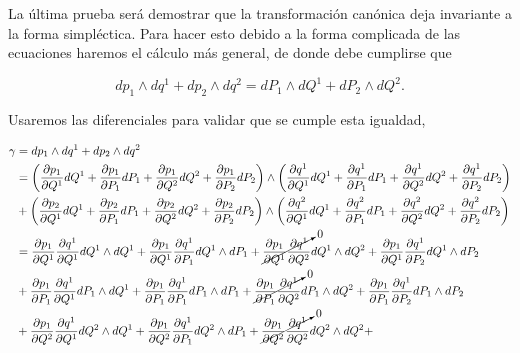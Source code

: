 \documentclass[a4paper,10pt]{article}
\numberwithin{equation}{section}
\begin{document}
La última prueba será demostrar que la transformación canónica deja invariante 
a la forma simpléctica. Para hacer esto debido a la forma complicada de las ecuaciones 
haremos el cálculo más general, de donde debe cumplirse que 

\begin{equation}
 dp_1 \wedge dq^1 + dp_2 \wedge dq^2 = dP_1 \wedge dQ^1 + dP_2 \wedge dQ^2.
\end{equation}

Usaremos las diferenciales para validar que se cumple esta igualdad,

\begin{align*}
 \gamma &= dp_1 \wedge dq^1 + dp_2 \wedge dq^2 \\
 &= \left(\frac{\partial p_1}{\partial Q^1}dQ^1 + \frac{\partial p_1}{\partial P_1}dP_1 + 
 \frac{\partial p_1}{\partial Q^2}dQ^2 + \frac{\partial p_1}{\partial P_2}dP_2 \right) 
 \wedge \left(\frac{\partial q^1}{\partial Q^1}dQ^1 + \frac{\partial q^1}{\partial P_1}dP_1 + 
 \frac{\partial q^1}{\partial Q^2}dQ^2 + \frac{\partial q^1}{\partial P_2}dP_2 \right) \\
 &+ \left(\frac{\partial p_2}{\partial Q^1}dQ^1 + \frac{\partial p_2}{\partial P_1}dP_1 + 
 \frac{\partial p_2}{\partial Q^2}dQ^2 + \frac{\partial p_2}{\partial P_2}dP_2 \right) 
 \wedge \left(\frac{\partial q^2}{\partial Q^1}dQ^1 + \frac{\partial q^2}{\partial P_1}dP_1 + 
 \frac{\partial q^2}{\partial Q^2}dQ^2 + \frac{\partial q^2}{\partial P_2}dP_2 \right) \\
 &= \frac{\partial p_1}{\partial Q^1}\frac{\partial q^1}{\partial Q^1}dQ^1 \wedge dQ^1 + 
 \frac{\partial p_1}{\partial Q^1}\frac{\partial q^1}{\partial P_1}dQ^1 \wedge dP_1 + 
 \cancelto{0}{\frac{\partial p_1}{\partial Q^1}\frac{\partial q^1}{\partial Q^2}}dQ^1 \wedge dQ^2 + 
 \frac{\partial p_1}{\partial Q^1}\frac{\partial q^1}{\partial P_2}dQ^1 \wedge dP_2 \\
 &+ \frac{\partial p_1}{\partial P_1}\frac{\partial q^1}{\partial Q^1} dP_1 \wedge dQ^1 +
 \frac{\partial p_1}{\partial P_1}\frac{\partial q^1}{\partial P_1} dP_1 \wedge dP_1 + 
 \cancelto{0}{\frac{\partial p_1}{\partial P_1}\frac{\partial q^1}{\partial Q^2}} dP_1 \wedge dQ^2 + 
 \frac{\partial p_1}{\partial P_1}\frac{\partial q^1}{\partial P_2} dP_1 \wedge dP_2 \\
 &+  \frac{\partial p_1}{\partial Q^2}\frac{\partial q^1}{\partial Q^1} dQ^2 \wedge dQ^1 
 + \frac{\partial p_1}{\partial Q^2}\frac{\partial q^1}{\partial P_1} dQ^2 \wedge dP_1 + 
 \cancelto{0}{\frac{\partial p_1}{\partial Q^2}\frac{\partial q^1}{\partial Q^2}} dQ^2 \wedge dQ^2 + 

\end{align*}
\end{document}

